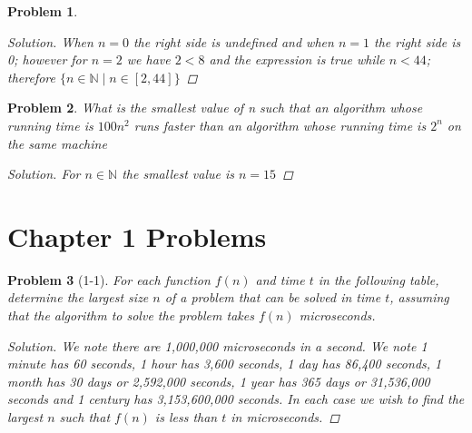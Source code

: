 \documentclass[oneside]{book}
\newtheorem{problem}{Problem}[section]
\begin{document}
\begin{spacing}{1.618}
\begin{problem}
\begin{proof}[Solution]
		When $n=0$ the right side is undefined and when $n=1$ the right side is 0; however for $n=2$ we have $2<8$ and the expression is true while $n<44$; therefore $\{n\in\mathbb{N}\mid n\in[2, 44]\}$
	\end{proof}
\end{problem}

\begin{problem}
	What is the smallest value of n such that an algorithm whose running time is $100n^2$ runs faster than an algorithm whose running time is $2^n$ on the same machine
	\begin{proof}[Solution]
		For $n\in \mathbb{N}$ the smallest value is $n=15$
	\end{proof}	
\end{problem}

\section{Chapter 1 Problems}

\begin{problem}[1-1]
	For each function $f(n)$ and time $t$ in the following table, determine the largest size $n$ of a problem that can be solved in time $t$, assuming that the algorithm to solve the problem takes $f(n)$ microseconds. 
	\begin{proof}[Solution]
		We note there are 1,000,000 microseconds in a second. We note 1 minute has 60 seconds, 1 hour has 3,600 seconds, 1 day has 86,400 seconds, 1 month has 30 days or 2,592,000 seconds, 1 year has 365 days or 31,536,000 seconds and 1 century has   3,153,600,000 seconds. In each case we wish to find the largest $n$ such that $f(n)$ is less than $t$ in microseconds. 
		

\end{proof}
\end{problem}
\end{spacing}
\end{document}

